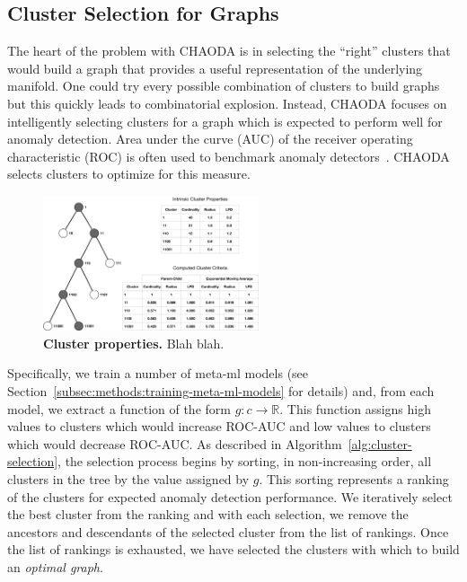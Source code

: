 \subsection{Cluster Selection for Graphs}
\label{subsec:methods:cluster-selection-for-graphs}

The heart of the problem with CHAODA is in selecting the ``right'' clusters that would build a graph that provides a useful representation of the underlying manifold.
One could try every possible combination of clusters to build graphs but this quickly leads to combinatorial explosion.
Instead, CHAODA focuses on intelligently selecting clusters for a graph which is expected to perform well for anomaly detection.
Area under the curve (AUC) of the receiver operating characteristic (ROC) is often used to benchmark anomaly detectors~\cite{fawcett2006introduction}.
CHAODA selects clusters to optimize for this measure.

\begin{figure}[ht!]
    \centering
    \includegraphics[width=2.5in]{images/chaoda-cluster-properties.pdf}
    \caption{\textbf{Cluster properties.}
        Blah blah.}
    \label{fig:methods:cluster-properties}
\end{figure}

Specifically, we train a number of meta-ml models (see Section~\ref{subsec:methods:training-meta-ml-models} for details) and, from each model, we extract a function of the form $g : c \rightarrow \mathbb{R}$.
This function assigns high values to clusters which would increase ROC-AUC and low values to clusters which would decrease ROC-AUC.
As described in Algorithm~\ref{alg:cluster-selection}, the selection process begins by sorting, in non-increasing order, all clusters in the tree by the value assigned by $g$.
This sorting represents a ranking of the clusters for expected anomaly detection performance.
We iteratively select the best cluster from the ranking and with each selection, we remove the ancestors and descendants of the selected cluster from the list of rankings.
Once the list of rankings is exhausted, we have selected the clusters with which to build an \textit{optimal graph}.

